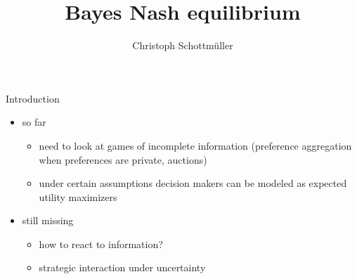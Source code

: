 \documentclass[bigger]{beamer}
\author{Christoph Schottmüller}
\date{}
\title{Bayes Nash equilibrium}
\begin{document}
\maketitle

\begin{frame}[label={sec:org6c62038}]{Introduction}
\begin{itemize}
\item so far
\begin{itemize}
\item need to look at games of incomplete information (preference aggregation when preferences are private, auctions)
\item under certain assumptions decision makers can be modeled as expected utility maximizers
\end{itemize}
\item still missing
\begin{itemize}
\item how to react to information?
\item strategic interaction under uncertainty
\end{itemize}
\end{itemize}
\end{frame}
\end{document}
